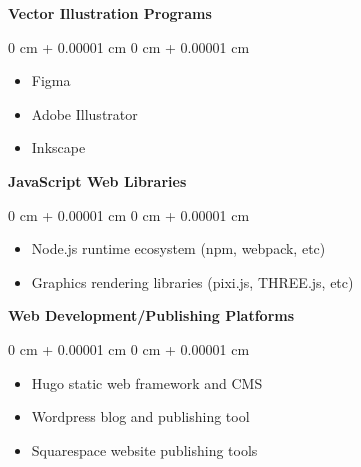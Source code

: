 \documentclass[10pt, letterpaper]{article}
\newenvironment{onecolentry}{
    \begin{adjustwidth}{
        0 cm + 0.00001 cm
    }{
        0 cm + 0.00001 cm
    }
}{
    \end{adjustwidth}
} %
\begin{document}
        \vspace{0.2 cm}
        
        \textbf{Vector Illustration Programs}
        
        \begin{onecolentry}
            \begin{itemize}
                \item Figma
                \item Adobe Illustrator 
                \item Inkscape
            \end{itemize}
        \end{onecolentry}
        
        \vspace{0.2 cm}
        
        \textbf{JavaScript Web Libraries}
        
        \begin{onecolentry}
            \begin{itemize}
                \item Node.js runtime ecosystem (npm, webpack, etc)
                \item Graphics rendering libraries (pixi.js, THREE.js, etc)
            \end{itemize}
        \end{onecolentry}
        
        \vspace{0.2 cm}
        
        \textbf{Web Development/Publishing Platforms}
        
        \begin{onecolentry}
            \begin{itemize}
                \item Hugo static web framework and CMS
                \item Wordpress blog and publishing tool
                \item Squarespace website publishing tools
            \end{itemize}
        \end{onecolentry}
        
        \vspace{0.2 cm}
        
\end{document}
